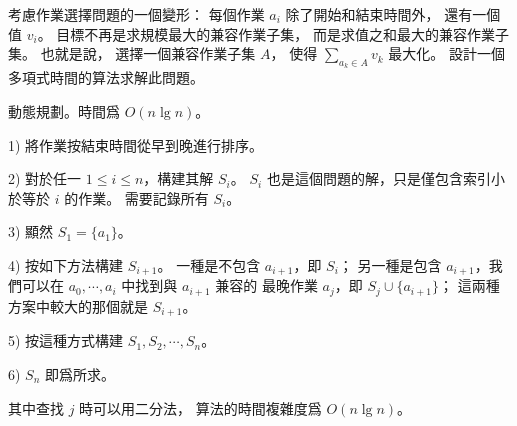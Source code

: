 \startEXERCISE
考慮作業選擇問題的一個變形：
每個作業 $a_i$ 除了開始和結束時間外，
還有一個值 $v_i$。
目標不再是求規模最大的兼容作業子集，
而是求值之和最大的兼容作業子集。
也就是說，
選擇一個兼容作業子集 $A$，
使得 $\sum_{a_k\in A} v_k$ 最大化。
設計一個多項式時間的算法求解此問題。
\stopEXERCISE

\startANSWER
動態規劃。時間爲 $O(n\lg n)$。

1) 將作業按結束時間從早到晚進行排序。

2) 對於任一 $1\le i\le n$，構建其解 $S_i$。
 $S_i$ 也是這個問題的解，只是僅包含索引小於等於 $i$ 的作業。
需要記錄所有 $S_i$。

3) 顯然 $S_1 = \{a_1\}$。

4) 按如下方法構建 $S_{i+1}$。
一種是不包含 $a_{i+1}$，即 $S_{i}$；
另一種是包含 $a_{i+1}$，我們可以在 $a_0,\cdots,a_{i}$ 中找到與 $a_{i+1}$ 兼容的
最晚作業 $a_j$，即 $S_j\cup \{a_{i+1}\}$；
這兩種方案中較大的那個就是 $S_{i+1}$。

5) 按這種方式構建 $S_1,S_2,\cdots,S_n$。

6) $S_n$ 即爲所求。

其中查找 $j$ 時可以用二分法，
算法的時間複雜度爲 $O(n\lg n)$。
\stopANSWER
